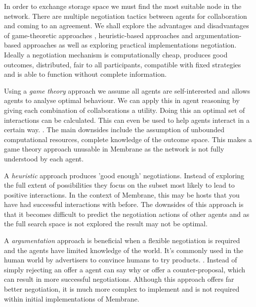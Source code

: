 \documentclass[11pt, a4paper, twocolumn, twoside]{report}
\begin{document}
In order to exchange storage space we must find the most suitable node in the network. There are multiple negotiation tactics between agents for collaboration and coming to an agreement. \citep{beer1999negotiation} We shall explore the advantages and disadvantages of game-theoretic approaches \citep*{rosenschein1994rules, kraus2001strategic, sandholm2002algorithm}, heuristic-based approaches \citep*{faratin2000automated, fatima2002multi} and argumentation-based approaches \citep*{kraus1998reaching, jennings1998argumentation} as well as exploring practical implementations negotiation. Ideally a negotiation mechanism is computationally cheap, produces good outcomes, distributed, fair to all participants, compatible with fixed strategies and is able to function without complete information. \citep{rahwan2005interest}

Using a \emph{game theory} approach we assume all agents are self-interested and allows agents to analyse optimal behaviour. \citep{osborne1994course} We can apply this in agent reasoning by giving each combination of collaborations a utility. Doing this an optimal set of interactions can be calculated. This can even be used to help agents interact in a certain way. \citep{varian1995economic}. The main downsides include the assumption of unbounded computational resources, complete knowledge of the outcome space. \citep{rahwan2005interest} This makes a game theory approach unusable in Membrane as the network is not fully understood by each agent.

A \emph{heuristic} approach produces 'good enough' negotiations. Instead of exploring the full extent of possibilities they focus on the subset most likely to lead to positive interactions. In the context of Membrane, this may be hosts that you have had successful interactions with before. The downsides of this approach is that it becomes difficult to predict the negotiation actions of other agents and as the full search space is not explored the result may not be optimal. \citep{jennings2001automated}

A \emph{argumentation} approach is beneficial when a flexible negotiation is required and the agents have limited knowledge of the world. It's commonly used in the human world by advertisers to convince humans to try products. \citep{slade2002reasons}. Instead of simply rejecting an offer a agent can say why or offer a counter-proposal, which can result in more successful negotiations. Although this approach offers far better negotiation, it is much more complex to implement and is not required within initial implementations of Membrane.
\end{document}
